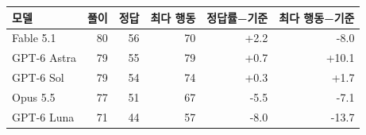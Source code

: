 \begin{tabular}{lrrrrr}
\toprule
모델 & 풀이 & 정답 & 최다 행동 & 정답률−기준 & 최다 행동−기준 \\
\midrule
Fable 5.1 & 80 & 56 & 70 & +2.2 & -8.0 \\
GPT-6 Astra & 79 & 55 & 79 & +0.7 & +10.1 \\
GPT-6 Sol & 79 & 54 & 74 & +0.3 & +1.7 \\
Opus 5.5 & 77 & 51 & 67 & -5.5 & -7.1 \\
GPT-6 Luna & 71 & 44 & 57 & -8.0 & -13.7 \\
\bottomrule
\end{tabular}
